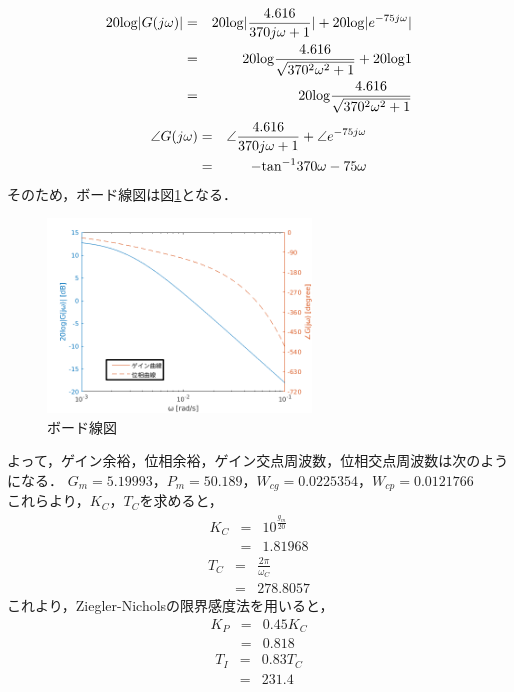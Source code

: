 \documentclass[12pt]{jsarticle}
\begin{document}
\begin{eqnarray}
  20{\rm log}|G(j\omega)| &=& 20{\rm log}|\frac{4.616}{370j\omega+1}| + 20{\rm log}|e^{-75j\omega}| \\
  &=& 20{\rm log}\frac{4.616}{\sqrt{370^2\omega^2+1}} + 20{\rm log}1 \\
  &=& 20{\rm log}\frac{4.616}{\sqrt{370^2\omega^2+1}}
\end{eqnarray}
\begin{eqnarray}
  \angle G(j\omega) &=& \angle \frac{4.616}{370j\omega+1} + \angle e^{-75j\omega} \\
  &=& -{\rm tan}^{-1}370\omega - 75\omega
\end{eqnarray}
そのため，ボード線図は図\ref{BodeDiagram}となる．

\begin{figure}[tb]
  \begin{center}
    \includegraphics[clip,width=7.0cm]{../graph/BodeDiagram.png}
    \caption{ボード線図}
    \label{BodeDiagram}
  \end{center}
\end{figure}

よって，ゲイン余裕，位相余裕，ゲイン交点周波数，位相交点周波数は次のようになる．
$G_m=5.19993$，$P_m=50.189$，$W_{cg}=0.0225354$，$W_{cp}=0.0121766$ \\
これらより，$K_C$，$T_C$を求めると，
\begin{eqnarray}
  \label{}
  K_C &=& 10^{\frac{g_m}{20}} \\
  &=& 1.81968
\end{eqnarray}
\begin{eqnarray}
  \label{}
  T_C &=& \frac{2\pi}{\omega_C} \\
  &=& 278.8057
\end{eqnarray}
これより，Ziegler-Nicholsの限界感度法を用いると，
\begin{eqnarray}
  \label{}
  K_P &=& 0.45 K_C \\
  &=& 0.818
\end{eqnarray}
\begin{eqnarray}
  T_I &=& 0.83 T_C \\
  &=& 231.4
\end{eqnarray}
\end{document}
